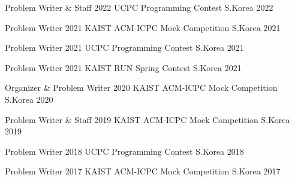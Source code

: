 

\begin{cvhonors}

  \cvhonor
    {Problem Writer \& Staff} %
    {2022 UCPC Programming Contest} %
    {S.Korea} %
    {2022} %

  \cvhonor
    {Problem Writer} %
    {2021 KAIST ACM-ICPC Mock Competition} %
    {S.Korea} %
    {2021} %

  \cvhonor
    {Problem Writer} %
    {2021 UCPC Programming Contest} %
    {S.Korea} %
    {2021} %

  \cvhonor
    {Problem Writer} %
    {2021 KAIST RUN Spring Contest} %
    {S.Korea} %
    {2021} %
    
  \cvhonor
    {Organizer \& Problem Writer} %
    {2020 KAIST ACM-ICPC Mock Competition} %
    {S.Korea} %
    {2020} %
    
  \cvhonor
    {Problem Writer \& Staff} %
    {2019 KAIST ACM-ICPC Mock Competition} %
    {S.Korea} %
    {2019} %

  \cvhonor
    {Problem Writer} %
    {2018 UCPC Programming Contest} %
    {S.Korea} %
    {2018} %

  \cvhonor
    {Problem Writer} %
    {2017 KAIST ACM-ICPC Mock Competition} %
    {S.Korea} %
    {2017} %

\end{cvhonors}
